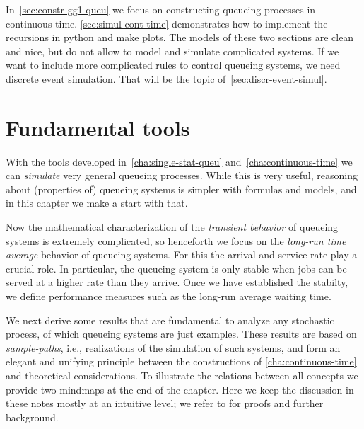 In~\cref{sec:constr-gg1-queu} we focus on constructing queueing processes in continuous time.
\cref{sec:simul-cont-time} demonstrates how to implement the recursions in python and make plots.
The models of these two sections are clean and nice, but do not allow to model and simulate complicated systems.
If we want to include more complicated rules to control queueing systems, we need discrete event simulation. That will be the topic of~\cref{sec:discr-event-simul}.







%





% 




\chapter{Fundamental tools}
\label{cha:fundamental-tools}

With the tools developed in~\cref{cha:single-stat-queu} and~\cref{cha:continuous-time} we can \emph{simulate} very general queueing processes.
While this is very useful, reasoning about (properties of) queueing systems is simpler with formulas and models, and in this chapter we make a start with that.

Now the mathematical characterization of the \emph{transient behavior} of queueing systems is extremely complicated, so henceforth we focus on the \emph{long-run time average} behavior of queueing systems. For this the arrival and service rate play a crucial role. %
In particular, the queueing system is only stable when jobs can be served at a higher rate than they arrive.
Once we have established the stabilty, we  define performance measures such as the long-run average waiting time.

We next derive some results that are fundamental to analyze any stochastic process, of which queueing systems are just examples.
These results are based on \emph{sample-paths}, i.e., realizations of the simulation of such systems, and form an elegant and unifying principle between the constructions of \cref{cha:continuous-time} and theoretical considerations.
To illustrate the relations between all concepts we provide two mindmaps at the end of the chapter.
Here we keep the discussion in these notes mostly at an intuitive level; we refer to \cite{el-taha98:_sampl_path_analy_queuein_system} for proofs and further background.

